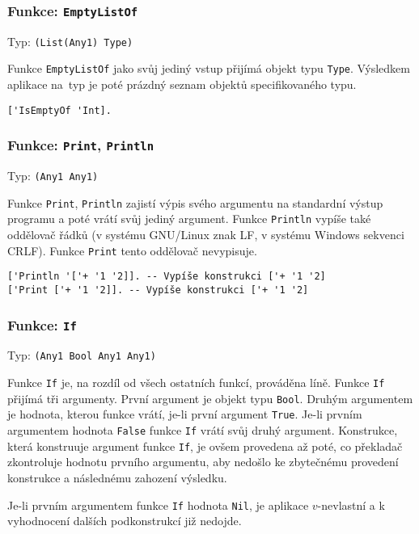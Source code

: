 \subsubsection*{Funkce: \lstinline|EmptyListOf|}
Typ: \lstinline{(List(Any1) Type)}

Funkce \lstinline{EmptyListOf} jako svůj jediný vstup přijímá objekt typu \lstinline{Type}.
Výsledkem aplikace na~typ je poté prázdný seznam objektů specifikovaného typu.

\begin{lstlisting}[caption={Ukázka využití EmptyListOf}]
['IsEmptyOf 'Int].
\end{lstlisting}

\subsubsection*{Funkce: \lstinline|Print|, \lstinline{Println}}
Typ: \lstinline{(Any1 Any1)}

Funkce \lstinline{Print}, \lstinline{Println} zajistí výpis svého argumentu na standardní výstup
programu a poté vrátí svůj jediný argument. Funkce \lstinline{Println} vypíše také oddělovač řádků
(v systému GNU/Linux znak LF, v systému Windows sekvenci CRLF). Funkce \lstinline{Print} tento
oddělovač nevypisuje.

\begin{lstlisting}[caption={Ukázka využití Print, Println}]
['Println '['+ '1 '2]]. -- Vypíše konstrukci ['+ '1 '2]
['Print ['+ '1 '2]]. -- Vypíše konstrukci ['+ '1 '2]
\end{lstlisting}

\subsubsection*{Funkce: \lstinline{If}}
Typ: \lstinline{(Any1 Bool Any1 Any1)}

Funkce \lstinline{If} je, na rozdíl od všech ostatních funkcí, prováděna líně. Funkce \lstinline{If}
přijímá tři argumenty. První argument je objekt typu \lstinline{Bool}. Druhým argumentem je hodnota,
kterou funkce vrátí, je-li první argument \lstinline{True}. Je-li prvním argumentem hodnota
\lstinline{False} funkce \lstinline{If} vrátí svůj druhý argument. Konstrukce, která konstruuje
argument funkce \lstinline{If}, je ovšem provedena až poté, co překladač zkontroluje hodnotu prvního
argumentu, aby nedošlo ke zbytečnému provedení konstrukce a následnému zahození výsledku.

Je-li prvním argumentem funkce \lstinline{If} hodnota \lstinline{Nil}, je aplikace $v$-nevlastní
a k vyhodnocení dalších podkonstrukcí již nedojde.

